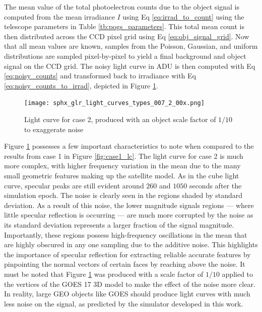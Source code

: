 The mean value of the total photoelectron counts due to the object signal is computed from the mean irradiance $I$ using Eq \ref{eq:irrad_to_count} using the telescope parameters in Table \ref{tb:pogs_parameters}. This total mean count is then distributed across the CCD pixel grid using Eq \ref{eq:obj_signal_grid}. Now that all mean values are known, samples from the Poisson, Gaussian, and uniform distributions are sampled pixel-by-pixel to yield a final background and object signal on the CCD grid. The noisy light curve in ADU is then computed with Eq \ref{eq:noisy_counts} and transformed back to irradiance with Eq \ref{eq:noisy_counts_to_irrad}, depicted in Figure \ref{fig:case2_lc}.

\begin{figure}[!htb]
  \centering
  \texttt{[image: sphx\_glr\_light\_curves\_types\_007\_2\_00x.png]}
  \caption{Light curve for case 2, produced with an object scale factor of $1/10$ to exaggerate noise}
  \label{fig:case2_lc}
\end{figure}

Figure \ref{fig:case2_lc} possesses a few important characteristics to note when compared to the results from case 1 in Figure \ref{fig:case1_lc}. The light curve for case 2 is much more complex, with higher frequency variation in the mean due to the many small geometric features making up the satellite model. As in the cube light curve, specular peaks are still evident around $260$ and $1050$ seconds after the simulation epoch. The noise is clearly seen in the regions shaded by standard deviation. As a result of this noise, the lower magnitude signals regions --- where little specular reflection is occurring --- are much more corrupted by the noise as its standard deviation represents a larger fraction of the signal magnitude. Importantly, these regions possess high-frequency oscillations in the mean that are highly obscured in any one sampling due to the additive noise. This highlights the importance of specular reflection for extracting reliable accurate features by pinpointing the normal vectors of certain faces by reaching above the noise. It must be noted that Figure \ref{fig:case2_lc} was produced with a scale factor of $1/10$ applied to the vertices of the GOES 17 3D model to make the effect of the noise more clear. In reality, large GEO objects like GOES should produce light curves with much less noise on the signal, as predicted by the simulator developed in this work. 